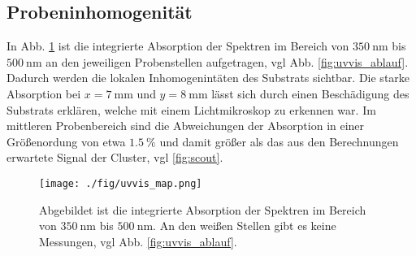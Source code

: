 \subsection{Probeninhomogenität}
In Abb. \ref{fig:uvvis_map} ist die integrierte Absorption der Spektren im Bereich von $\SI{350}{\nm}$ bis $\SI{500}{\nm}$ an den jeweiligen Probenstellen aufgetragen, vgl Abb. \ref{fig:uvvis_ablauf}.
Dadurch werden die lokalen Inhomogenintäten des Substrats sichtbar.
Die starke Absorption bei $x=\SI{7}{\mm}$ und $y=\SI{8}{\mm}$ lässt sich durch einen Beschädigung des Substrats erklären, welche mit einem Lichtmikroskop zu erkennen war.
Im mittleren Probenbereich sind die Abweichungen der Absorption in einer Größenordung von etwa $\SI{1.5}{\%}$ und damit größer als das aus den Berechnungen erwartete Signal der Cluster, vgl \ref{fig:scout}.
\begin{figure}
    \centering
    \texttt{[image: ./fig/uvvis\_map.png]}
    \caption{Abgebildet ist die integrierte Absorption der Spektren im Bereich von $\SI{350}{\nm}$ bis $\SI{500}{\nm}$. An den weißen Stellen gibt es keine Messungen, vgl Abb. \ref{fig:uvvis_ablauf}.}
    \label{fig:uvvis_map}
\end{figure}






